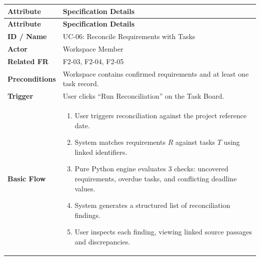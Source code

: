 \begin{longtable}{>{\raggedright\arraybackslash}p{}>{\raggedright\arraybackslash}p{}}

\hline

\rowcolor{tablehead}

\textbf{Attribute} & \textbf{Specification Details} \\ \hline

\endfirsthead

\hline

\rowcolor{tablehead}

\textbf{Attribute} & \textbf{Specification Details} \\ \hline

\endhead

\endfoot

\endlastfoot

\textbf{ID / Name} & UC-06: Reconcile Requirements with Tasks \\ \hline

\textbf{Actor} & Workspace Member \\ \hline

\textbf{Related FR} & F2-03, F2-04, F2-05 \\ \hline

\textbf{Preconditions} & Workspace contains confirmed requirements and at least one task record. \\ \hline

\textbf{Trigger} & User clicks ``Run Reconciliation'' on the Task Board. \\ \hline

\textbf{Basic Flow} & \begin{enumerate}[nosep,leftmargin=*,label=\arabic*.]

    \item User triggers reconciliation against the project reference date.

    \item System matches requirements $R$ against tasks $T$ using linked identifiers.

    \item Pure Python engine evaluates 3 checks: uncovered requirements, overdue tasks, and conflicting deadline values.

    \item System generates a structured list of reconciliation findings.

    \item User inspects each finding, viewing linked source passages and discrepancies.


\end{enumerate}
\end{longtable}
